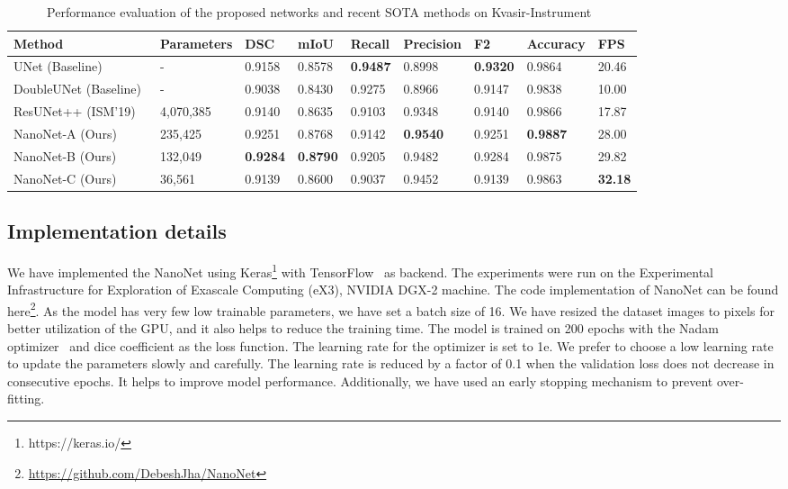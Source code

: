 \documentclass[journal]{IEEEtran}
\begin{document}
\begin{table*}[!t]
\centering
\caption{Performance evaluation of the proposed networks and recent \ac{SOTA} methods on Kvasir-Instrument~\cite{jha2020kvasirInstrument}}
\footnotesize
\begin{tabular}{l|l|l|l|l|l|l|l|l}
\toprule
\textbf{Method}&\textbf{Parameters} & \textbf{DSC} & \textbf{mIoU} & \textbf{Recall} & \textbf{Precision}& \textbf{F2} & \textbf{Accuracy} &\textbf{FPS} \\ \hline

UNet (Baseline)~\cite{ronneberger2015u}&- & 0.9158 & 0.8578 & \textbf{0.9487} & 0.8998 & \textbf{0.9320} & 0.9864 & 20.46\\ DoubleUNet (Baseline)~\cite{jha2020doubleUNet}& - & 0.9038 & 0.8430 & 0.9275 & 0.8966 & 0.9147 & 0.9838 & 10.00 \\ 

ResUNet++ (ISM'19)~\cite{jha2019resunet++}& 4,070,385 & 0.9140 & 0.8635 & 0.9103 & 0.9348 & 0.9140 & 0.9866 & 17.87 \\

NanoNet-A (Ours) & 235,425 & 0.9251 & 0.8768 & 0.9142 & \textbf{0.9540} & 0.9251 & \textbf{0.9887} & 28.00 \\ NanoNet-B (Ours) & 132,049 & \textbf{0.9284} & \textbf{0.8790} & 0.9205 & 0.9482 & 0.9284 & 0.9875 & 29.82 \\ NanoNet-C (Ours)& 36,561  & 0.9139 & 0.8600 & 0.9037 & 0.9452 & 0.9139 & 0.9863 & \textbf{32.18} \\ 
\bottomrule
\end{tabular}
\label{tab:resultKvasir-Instrument}
\end{table*}


\subsection{Implementation details}
We have implemented the NanoNet using Keras\footnote{https://keras.io/} with TensorFlow~\cite{abadi2016tensorflow} as backend. The experiments were run on the Experimental Infrastructure for Exploration of Exascale Computing (eX3), NVIDIA DGX-2 machine. The code implementation of NanoNet can be found here\footnote{\url{https://github.com/DebeshJha/NanoNet}}.  As the model has very few low trainable parameters, we have set a batch size of 16. We have resized the dataset images to  pixels for better utilization of the GPU, and it also helps to reduce the training time. The model is trained on 200 epochs with the Nadam optimizer~\cite{dozat2016incorporating} and dice coefficient as the loss function. The learning rate for the optimizer is set to 1e. We prefer to choose a low learning rate to update the parameters slowly and carefully. The learning rate is reduced by a factor of 0.1 when the validation loss does not decrease in  consecutive epochs.  It helps to improve model performance. Additionally, we have used an early stopping mechanism to prevent over-fitting. 
\end{document}
